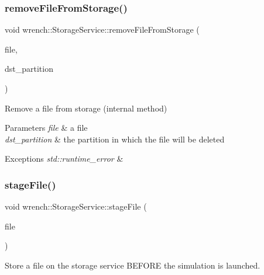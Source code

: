 \subsubsection{\texorpdfstring{remove\+File\+From\+Storage()}{removeFileFromStorage()}}
{\footnotesize\ttfamily void wrench\+::\+Storage\+Service\+::remove\+File\+From\+Storage (\begin{DoxyParamCaption}\item[{\hyperlink{classwrench_1_1_workflow_file}{Workflow\+File} $\ast$}]{file,  }\item[{std\+::string}]{dst\+\_\+partition }\end{DoxyParamCaption})\hspace{0.3cm}{\ttfamily [protected]}}



Remove a file from storage (internal method) 


\begin{DoxyParams}{Parameters}
{\em file} & a file \\
\hline
{\em dst\+\_\+partition} & the partition in which the file will be deleted\\
\hline
\end{DoxyParams}

\begin{DoxyExceptions}{Exceptions}
{\em std\+::runtime\+\_\+error} & \\
\hline
\end{DoxyExceptions}
\mbox{\label{classwrench_1_1_storage_service_ac054adcdeaf23cc0b8451df7926e8ae0}} 
\subsubsection{\texorpdfstring{stage\+File()}{stageFile()}}
{\footnotesize\ttfamily void wrench\+::\+Storage\+Service\+::stage\+File (\begin{DoxyParamCaption}\item[{\hyperlink{classwrench_1_1_workflow_file}{Workflow\+File} $\ast$}]{file }\end{DoxyParamCaption})\hspace{0.3cm}{\ttfamily [protected]}}



Store a file on the storage service B\+E\+F\+O\+RE the simulation is launched. 


